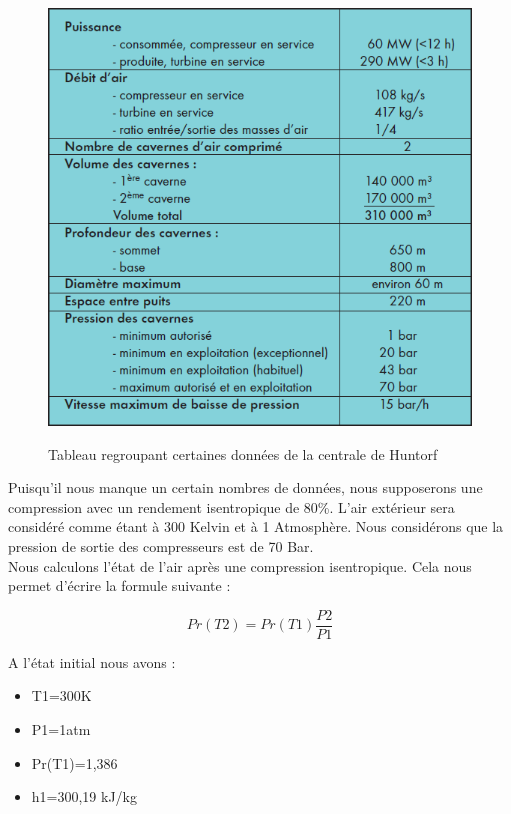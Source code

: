 \begin{figure}[!h]
\centering
\caption{Tableau regroupant certaines données de la centrale de Huntorf}
\includegraphics[scale=0.5]{PHOTO/tab1.png}
\label{tab1}
\end{figure}






\newpage

Puisqu'il nous manque un certain nombres de données, nous supposerons une compression avec un rendement isentropique de 80\%. L'air extérieur sera considéré comme étant à 300 Kelvin et à 1 Atmosphère. Nous considérons que la pression de sortie des compresseurs est de 70 Bar.\\

Nous calculons l'état de l'air après une compression isentropique. Cela nous permet d'écrire la formule suivante : 

\begin{equation}
Pr(T2)=Pr(T1)\frac{P2}{P1}
\label{pr_is}
\end{equation}

A l'état initial nous avons :

\begin{itemize}
\item T1=300K
\item P1=1atm
\item Pr(T1)=1,386
\item h1=300,19 kJ/kg\\
\end{itemize}

